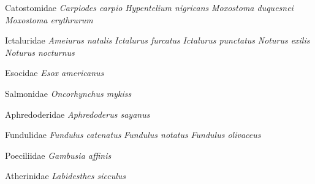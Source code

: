 \documentclass[11pt, hidelinks]{exam}
\begin{document}
\begin{multicols}{2}
Catostomidae\newline
	\hspace*{1em}\textit{Carpiodes carpio}\newline
	\hspace*{1em}\textit{Hypentelium nigricans}\newline
	\hspace*{1em}\textit{Moxostoma duquesnei}\newline
	\hspace*{1em}\textit{Moxostoma erythrurum}

Ictaluridae\newline
	\hspace*{1em}\textit{Ameiurus natalis}\newline
	\hspace*{1em}\textit{Ictalurus furcatus}\newline
	\hspace*{1em}\textit{Ictalurus punctatus}\newline
	\hspace*{1em}\textit{Noturus exilis}\newline
	\hspace*{1em}\textit{Noturus nocturnus}

Esocidae\newline
	\hspace*{1em}\textit{Esox americanus}
	

Salmonidae\newline
	\hspace*{1em}\textit{Oncorhynchus mykiss}
	
Aphredoderidae\newline
	\hspace*{1em}\textit{Aphredoderus sayanus}
	
Fundulidae\newline
	\hspace*{1em}\textit{Fundulus catenatus}\newline
	\hspace*{1em}\textit{Fundulus notatus}\newline
	\hspace*{1em}\textit{Fundulus olivaceus}
	

Poeciliidae\newline
	\hspace*{1em}\textit{Gambusia affinis}
	

Atherinidae\newline
	\hspace*{1em}\textit{Labidesthes sicculus}


\end{multicols}
\end{document}
